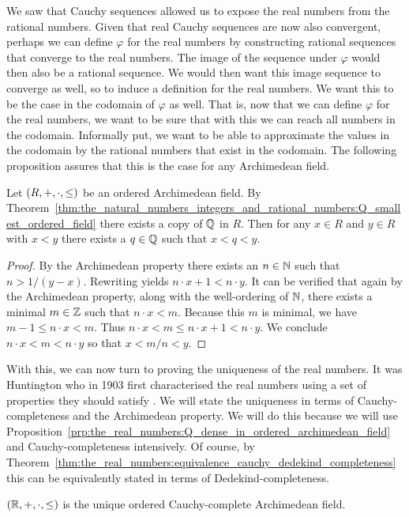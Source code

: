 \documentclass[../main.tex]{subfiles}
\begin{document}
We saw that Cauchy sequences allowed us to expose the real numbers from the rational numbers. Given that real Cauchy sequences are now also convergent, perhaps we can define $\varphi$ for the real numbers by constructing rational sequences that converge to the real numbers. The image of the sequence under $\varphi$ would then also be a rational sequence. We would then want this image sequence to converge as well, so to induce a definition for the real numbers. We want this to be the case in the codomain of $\varphi$ as well. That is, now that we can define $\varphi$ for the real numbers, we want to be sure that with this we can reach all numbers in the codomain. Informally put, we want to be able to approximate the values in the codomain by the rational numbers that exist in the codomain. The following proposition assures that this is the case for any Archimedean field.
\begin{proposition}\label{prp:the_real_numbers:Q_dense_in_ordered_archimedean_field}
    Let $(R,+,\linebreak\cdot,\leq)$ be an ordered Archimedean field. By Theorem~\ref{thm:the_natural_numbers_integers_and_rational_numbers:Q_smallest_ordered_field} there exists a copy of $\mathbb{Q}$ in $R$. Then for any $x\in R$ and $y\in R$ with $x<y$ there exists a $q\in\mathbb{Q}$ such that $x<q<y$.
\end{proposition}
\begin{proof}
    By the Archimedean property there exists an $n\in\mathbb{N}$ such that $n>1/(y-x)$. Rewriting yields $n\cdot x+1<n\cdot y$. It can be verified that again by the Archimedean property, along with the well-ordering of $\mathbb{N}$, there exists a minimal $m\in\mathbb{Z}$ such that $n\cdot x<m$. Because this $m$ is minimal, we have $m-1\leq n\cdot x<m$. Thus $n\cdot x<m\leq n\cdot x+1<n\cdot y$. We conclude $n\cdot x<m<n\cdot y$ so that $x<m/n<y$.
\end{proof}
With this, we can now turn to proving the uniqueness of the real numbers. It was Huntington who in 1903 first characterised the real numbers using a set of properties they should satisfy \cite{Huntington1903}. We will state the uniqueness in terms of Cauchy-completeness and the Archimedean property. We will do this because we will use Proposition~\ref{prp:the_real_numbers:Q_dense_in_ordered_archimedean_field} and Cauchy-completeness intensively. Of course, by Theorem~\ref{thm:the_real_numbers:equivalence_cauchy_dedekind_completeness} this can be equivalently stated in terms of Dedekind-completeness.
\begin{theorem}\label{thm:the_real_numbers:uniqueness_R}
    $(\mathbb{R},+,\cdot,\leq)$ is the unique ordered Cauchy-complete Archimedean field.
\end{theorem}
\end{document}
